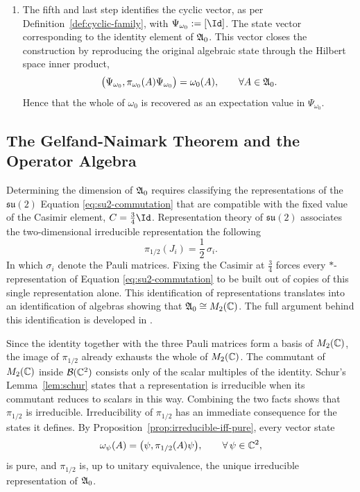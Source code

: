 \begin{enumerate}
 		\item The fifth and last step identifies the cyclic vector, as per Definition~\ref{def:cyclic-family}, with $\Psi_{\omega_0}:=[\Id]$. The state vector corresponding to the identity element of $\mathfrak{A}_0$. This vector closes the construction by reproducing the original algebraic state through the Hilbert space inner product,
 		\begin{equation}
 			\big(\Psi_{\omega_0},\pi_{\omega_0}(A)\Psi_{\omega_0}\big)=\omega_0(A), \qquad \forall A\in\mathfrak{A}_0.
 		\end{equation}
 		Hence that the whole of $\omega_0$ is recovered as an expectation value in $\Psi_{\omega_0}$.
 	\end{enumerate}
 	
 	\subsection*{The Gelfand-Naimark Theorem and the Operator Algebra}
 	
 	Determining the dimension of $\mathfrak{A}_0$ requires classifying the representations of the $\mathfrak{su}(2)$ Equation \eqref{eq:su2-commutation} that are compatible with the fixed value of the Casimir element, $C = \frac34\Id$. Representation theory of $\mathfrak{su}(2)$ associates the two-dimensional irreducible representation the following
 	\begin{equation}
 		\pi_{1/2}(J_i) = \frac12\,\sigma_i.
 		\label{eq:pauli-representation}
 	\end{equation}
 	 In which $\sigma_i$ denote the Pauli matrices. Fixing the Casimir at $\frac34$ forces every $*$-representation of Equation \eqref{eq:su2-commutation} to be built out of copies of this single representation alone. This identification of representations translates into an identification of algebras showing that $\mathfrak{A}_0 \cong M_2(\mathbb{C})$. The full argument behind this identification is developed in \cite[Section 4.4]{hallLieGroupsLie2003}.
 	
 	Since the identity together with the three Pauli matrices form a basis of $M_2(\mathbb{C})$, the image of $\pi_{1/2}$ already exhausts the whole of $M_2(\mathbb{C})$. The commutant of $M_2(\mathbb{C})$ inside $\mathcal{B}(\C^2)$ consists only of the scalar multiples of the identity. Schur's Lemma~\ref{lem:schur} states that a representation is irreducible when its commutant reduces to scalars in this way. Combining the two facts shows that $\pi_{1/2}$ is irreducible. Irreducibility of $\pi_{1/2}$ has an immediate consequence for the states it defines. By Proposition~\ref{prop:irreducible-iff-pure}, every vector state
 	\begin{equation}
 		\omega_\psi(A)=\big(\psi,\pi_{1/2}(A)\psi\big), \qquad \forall\,\psi\in\mathbb{C}^2,
 	\end{equation}
 	is pure, and $\pi_{1/2}$ is, up to unitary equivalence, the unique irreducible representation of $\mathfrak{A}_0$.
 	
